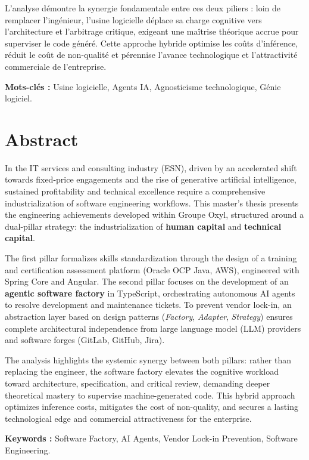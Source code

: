 \documentclass{tnreport}
\begin{document}
L'analyse démontre la synergie fondamentale entre ces deux piliers : loin de remplacer l'ingénieur, l'usine logicielle déplace sa charge cognitive vers l'architecture et l'arbitrage critique, exigeant une maîtrise théorique accrue pour superviser le code généré. Cette approche hybride optimise les coûts d'inférence, réduit le coût de non-qualité et pérennise l'avance technologique et l'attractivité commerciale de l'entreprise.

\vspace{0.3cm}
{\bf Mots-clés :} Usine logicielle, Agents IA, Agnosticisme technologique, Génie logiciel.


\section*{Abstract}

In the IT services and consulting industry (ESN), driven by an accelerated shift towards fixed-price engagements and the rise of generative artificial intelligence, sustained profitability and technical excellence require a comprehensive industrialization of software engineering workflows. This master's thesis presents the engineering achievements developed within Groupe Oxyl, structured around a dual-pillar strategy: the industrialization of \textbf{human capital} and \textbf{technical capital}.

The first pillar formalizes skills standardization through the design of a training and certification assessment platform (Oracle OCP Java, AWS), engineered with Spring Core and Angular. The second pillar focuses on the development of an \textbf{agentic software factory} in TypeScript, orchestrating autonomous AI agents to resolve development and maintenance tickets. To prevent vendor lock-in, an abstraction layer based on design patterns (\textit{Factory}, \textit{Adapter}, \textit{Strategy}) ensures complete architectural independence from large language model (LLM) providers and software forges (GitLab, GitHub, Jira).

The analysis highlights the systemic synergy between both pillars: rather than replacing the engineer, the software factory elevates the cognitive workload toward architecture, specification, and critical review, demanding deeper theoretical mastery to supervise machine-generated code. This hybrid approach optimizes inference costs, mitigates the cost of non-quality, and secures a lasting technological edge and commercial attractiveness for the enterprise.

\vspace{0.3cm}
{\bf Keywords :} Software Factory, AI Agents, Vendor Lock-in Prevention, Software Engineering.
\end{document}

